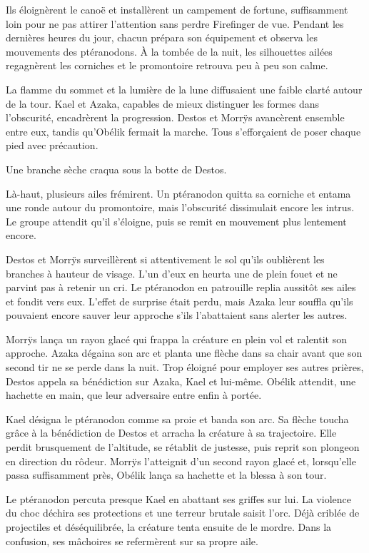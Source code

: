Ils éloignèrent le canoë et installèrent un campement de fortune, suffisamment loin pour ne pas attirer l'attention sans perdre Firefinger de vue. Pendant les dernières heures du jour, chacun prépara son équipement et observa les mouvements des ptéranodons. À la tombée de la nuit, les silhouettes ailées regagnèrent les corniches et le promontoire retrouva peu à peu son calme.

\scenebreak

La flamme du sommet et la lumière de la lune diffusaient une faible clarté autour de la tour. Kael et Azaka, capables de mieux distinguer les formes dans l'obscurité, encadrèrent la progression. Destos et Morrÿs avancèrent ensemble entre eux, tandis qu'Obélik fermait la marche. Tous s'efforçaient de poser chaque pied avec précaution.

Une branche sèche craqua sous la botte de Destos.

Là-haut, plusieurs ailes frémirent. Un ptéranodon quitta sa corniche et entama une ronde autour du promontoire, mais l'obscurité dissimulait encore les intrus. Le groupe attendit qu'il s'éloigne, puis se remit en mouvement plus lentement encore.

Destos et Morrÿs surveillèrent si attentivement le sol qu'ils oublièrent les branches à hauteur de visage. L'un d'eux en heurta une de plein fouet et ne parvint pas à retenir un cri. Le ptéranodon en patrouille replia aussitôt ses ailes et fondit vers eux. L'effet de surprise était perdu, mais Azaka leur souffla qu'ils pouvaient encore sauver leur approche s'ils l'abattaient sans alerter les autres.

Morrÿs lança un rayon glacé qui frappa la créature en plein vol et ralentit son approche. Azaka dégaina son arc et planta une flèche dans sa chair avant que son second tir ne se perde dans la nuit. Trop éloigné pour employer ses autres prières, Destos appela sa bénédiction sur Azaka, Kael et lui-même. Obélik attendit, une hachette en main, que leur adversaire entre enfin à portée.

Kael désigna le ptéranodon comme sa proie et banda son arc. Sa flèche toucha grâce à la bénédiction de Destos et arracha la créature à sa trajectoire. Elle perdit brusquement de l'altitude, se rétablit de justesse, puis reprit son plongeon en direction du rôdeur. Morrÿs l'atteignit d'un second rayon glacé et, lorsqu'elle passa suffisamment près, Obélik lança sa hachette et la blessa à son tour.

Le ptéranodon percuta presque Kael en abattant ses griffes sur lui. La violence du choc déchira ses protections et une terreur brutale saisit l'orc. Déjà criblée de projectiles et déséquilibrée, la créature tenta ensuite de le mordre. Dans la confusion, ses mâchoires se refermèrent sur sa propre aile.


